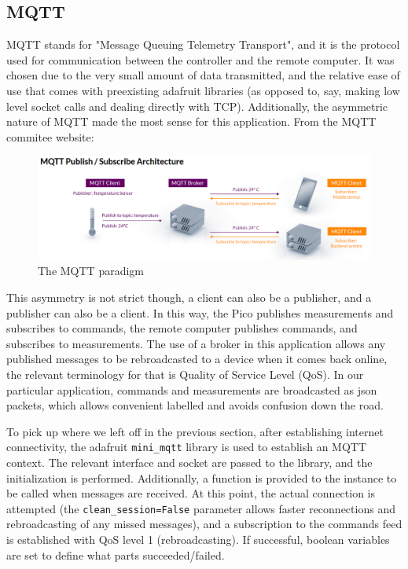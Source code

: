 \documentclass[11pt, letterpaper]{article}
\begin{document}
\subsection{MQTT}
MQTT stands for "Message Queuing Telemetry Transport", and it is the protocol used for communication between the controller and the remote computer. It was chosen due to the very small amount of data transmitted, and the relative ease of use that comes with preexisting adafruit libraries (as opposed to, say, making low level socket calls and dealing directly with TCP). Additionally, the asymmetric nature of MQTT made the most sense for this application. From the MQTT commitee website:

\begin{figure}[H]
    \centering
    \includegraphics[width=16cm]{mqttArch.png}
    \caption{ The MQTT paradigm }
    \label{fig:testCellSetup}
\end{figure}

This asymmetry is not strict though, a client can also be a publisher, and a publisher can also be a client. In this way, the Pico publishes measurements and subscribes to commands, the remote computer publishes commands, and subscribes to measurements. The use of a broker in this application allows any published messages to be rebroadcasted to a device when it comes back online, the relevant terminology for that is Quality of Service Level (QoS). In our particular application, commands and measurements are broadcasted as json packets, which allows convenient labelled and avoids confusion down the road.

To pick up where we left off in the previous section, after establishing internet connectivity, the adafruit \verb|mini_mqtt| library is used to establish an MQTT context. The relevant interface and socket are passed to the library, and the initialization is performed. Additionally, a function is provided to the instance to be called when messages are received. At this point, the actual connection is attempted (the \verb|clean_session=False| parameter allows faster reconnections and rebroadcasting of any missed messages), and a subscription to the commands feed is established with QoS level 1 (rebroadcasting). If successful, boolean variables are set to define what parts succeeded/failed. 
\end{document}
